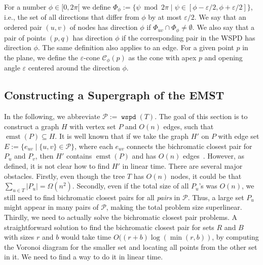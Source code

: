 \documentclass[11pt]{paper}
\newcommand {\eps} {\varepsilon}
\newcommand {\eqdef} {:=}
\DeclareMathOperator {\wspd}{\texttt{wspd}}
\DeclareMathOperator {\emst}{emst}
\begin{document}
For a number  $\phi \in [0, 2 \pi[$ we define
$\Phi_\phi \eqdef \{\psi \bmod 2 \pi \mid
\psi \in [\phi - \eps/2,
\phi + \eps/2] \}$, i.e., the set
of all directions that differ from $\phi$ by at most
$\eps/2$. We say
that an ordered pair  $(u, v)$ of nodes has direction $\phi$ if
$\Phi_{uv} \cap \Phi_\phi \neq \emptyset$.
We also say that a pair of points $(p,q)$
has direction
$\phi$ if the corresponding pair in the WSPD has
direction $\phi$. The same definition also applies to an edge.
For a given point $p$ in the plane, we define the
$\eps$-cone $\mathcal{C}_\phi (p)$ as the cone with apex $p$ and
opening angle $\eps$ centered around the direction $\phi$.

\subsection {Constructing a Supergraph of the EMST}\label{sec:emstsup}

In the following, we abbreviate $\mathcal{P} \eqdef \wspd(T)$.
The goal of this section is to construct a graph $H$
with vertex set $P$ and $O(n)$ edges, such that
$\emst(P) \subseteq H$. 
It is well known that if we take the graph $H'$ on $P$ with edge set
$E \eqdef \{e_{uv} \mid \{u,v\} \in \mathcal{P}\}$, where
each $e_{uv}$ connects the bichromatic closest pair for $P_u$ and $P_v$, 
then $H'$ contains $\emst(P)$ and has $O(n)$ edges~\cite{Eppstein00}.
However, as defined, it is not clear how to find $H'$ in linear time.
There are several major obstacles. Firstly, even though the tree $T$
has $O(n)$ nodes, it could be that $\sum_{u \in T} |P_u| = \Omega(n^2)$.
Secondly, even if the total size of all $P_u$'s was $O(n)$, we still need
to find bichromatic closest pairs for all \emph{pairs} in $\mathcal{P}$.
Thus, a large set $P_u$ might appear in many pairs of
$\mathcal{P}$, making the total problem size superlinear. Thirdly,
we need to actually solve the bichromatic closest pair problems. A 
straightforward solution to find the bichromatic closest pair for
sets $R$ and $B$ with sizes $r$ and $b$ would take time 
$O((r + b) \log(\min(r,b))$, by computing the Voronoi diagram
for the smaller set and locating all points from the other set in it.
We need to find a way to do it in linear time.
\end{document}
